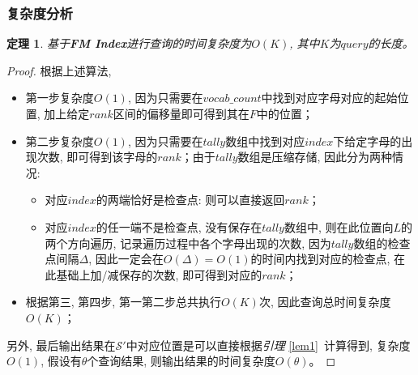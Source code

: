 \documentclass[UTF8]{ctexart}
\newcommand{\refl}[1]{\emph{引理} \ref{#1}\ }
\newtheorem{theory}{定理}
\begin{document}
    \subsubsection{复杂度分析}
    \begin{theory}
        基于\textbf{FM Index}进行查询的时间复杂度为$O(K)$, 其中$K$为$query$的长度。
    \end{theory}
    \begin{proof}
        根据上述算法, 
        \begin{itemize}
            \item 第一步复杂度$O(1)$, 因为只需要在$vocab\_count$中找到对应字母对应的起始位置, 加上给定$rank$区间的偏移量即可得到其在$F$中的位置；
            \item 第二步复杂度$O(1)$, 因为只需要在$tally$数组中找到对应$index$下给定字母的出现次数, 即可得到该字母的$rank$；由于$tally$数组是压缩存储, 因此分为两种情况:
                \begin{itemize}
                    \item 对应$index$的两端恰好是检查点: 则可以直接返回$rank$；
                    \item 对应$index$的任一端不是检查点, 没有保存在$tally$数组中, 则在此位置向$L$的两个方向遍历, 记录遍历过程中各个字母出现的次数, 因为$tally$数组的检查点间隔$\Delta$, 因此一定会在$O(\Delta) = O(1)$的时间内找到对应的检查点, 
                    在此基础上加/减保存的次数, 即可得到对应的$rank$；
                \end{itemize}
            \item 根据第三, 第四步, 第一第二步总共执行$O(K)$次, 因此查询总时间复杂度$O(K)$；
        \end{itemize}
        另外, 最后输出结果在$\mathcal{S'}$中对应位置是可以直接根据\refl{lem1}计算得到, 复杂度$O(1)$, 假设有$\theta $个查询结果, 则输出结果的时间复杂度$O(\theta)$。
    \end{proof}
\end{document}

